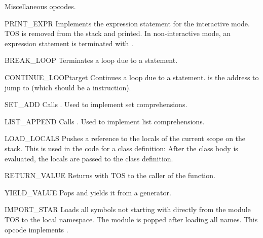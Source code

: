 Miscellaneous opcodes.

\begin{opcodedesc}{PRINT_EXPR}{}
Implements the expression statement for the interactive mode.  TOS is
removed from the stack and printed.  In non-interactive mode, an
expression statement is terminated with .
\end{opcodedesc}

\begin{opcodedesc}{BREAK_LOOP}{}
Terminates a loop due to a  statement.
\end{opcodedesc}

\begin{opcodedesc}{CONTINUE_LOOP}{target}
Continues a loop due to a  statement.  
is the address to jump to (which should be a 
instruction).
\end{opcodedesc}

\begin{opcodedesc}{SET_ADD}{}
Calls .  Used to implement set comprehensions.
\end{opcodedesc}

\begin{opcodedesc}{LIST_APPEND}{}
Calls .  Used to implement list comprehensions.
\end{opcodedesc}

\begin{opcodedesc}{LOAD_LOCALS}{}
Pushes a reference to the locals of the current scope on the stack.
This is used in the code for a class definition: After the class body
is evaluated, the locals are passed to the class definition.
\end{opcodedesc}

\begin{opcodedesc}{RETURN_VALUE}{}
Returns with TOS to the caller of the function.
\end{opcodedesc}

\begin{opcodedesc}{YIELD_VALUE}{}
Pops  and yields it from a generator.
\end{opcodedesc}

\begin{opcodedesc}{IMPORT_STAR}{}
Loads all symbols not starting with \character{_} directly from the module TOS
to the local namespace. The module is popped after loading all names.
This opcode implements .
\end{opcodedesc}

